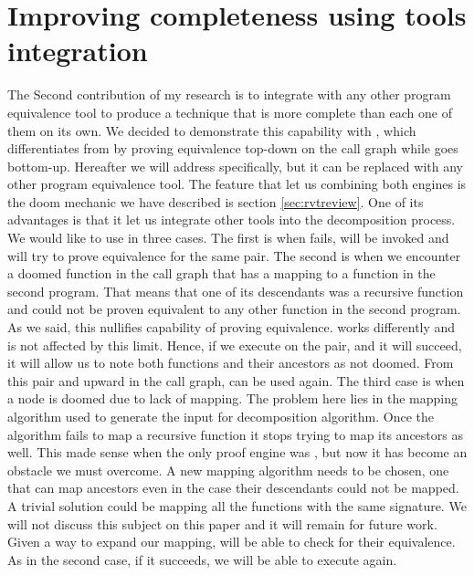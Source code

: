 \section{Improving completeness using tools integration}
The Second contribution of my research is to integrate  with any other program equivalence tool to produce a technique that is more complete than each one of them on its own. We decided to demonstrate this capability with  \cite{FelsingGrebingKlebanov2014}, which differentiates from  by proving equivalence top-down on the call graph while  goes bottom-up. Hereafter we will address  specifically, but it can be replaced with any other program equivalence tool. The feature that let us combining both engines is the doom mechanic we have described is section \ref{sec:rvtreview}. One of its advantages is that it let us integrate other tools into the decomposition process. We would like to use  in three cases. The first is when  fails,  will be invoked and will try to prove equivalence for the same pair. The second is when we encounter a doomed function in the call graph that has a mapping to a function in the second program. That means that one of its descendants was a recursive function and could not be proven equivalent to any other function in the second program. As we said, this nullifies  capability of proving equivalence.  works differently and is not affected by this limit. Hence, if we execute  on the pair, and it will succeed, it will allow us to note both functions and their ancestors as not doomed. From this pair and upward in the call graph,  can be used again. The third case is when a node is doomed due to lack of mapping. The problem here lies in the mapping algorithm used to generate the input for  decomposition algorithm. Once the algorithm fails to map a recursive function it stops trying to map its ancestors as well. This made sense when the only proof engine was , but now it has become an obstacle we must overcome. A new mapping algorithm needs to be chosen, one that can map ancestors even in the case their descendants could not be mapped. A trivial solution could be mapping all the functions with the same signature. We will not discuss this subject on this paper and it will remain for future work. Given a way to expand our mapping,  will be able to check for their equivalence. As in the second case, if it succeeds, we will be able to execute  again. 

